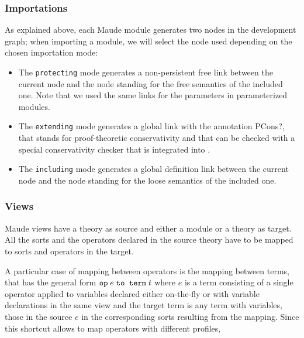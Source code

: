 \subsubsection{Importations}

As explained above, each Maude module generates two nodes in the development
graph;
when importing a module, we will select the node used depending on the
chosen importation mode:
\begin{itemize}

\item
The \verb"protecting" mode generates a non-persistent free link between
the current node and the node standing for the free semantics of the
included one. Note that we used the same links for the parameters in
parameterized modules.

\item
The \verb"extending" mode generates a global link with the annotation
\textsf{PCons?}, that stands for proof-theoretic conservativity and that
can be checked with a special conservativity checker that is
integrated into \Hets.

\item
The \verb"including" mode generates a global definition link between the
current node  and the node standing for the loose semantics of the
included one.
\end{itemize}

\subsubsection{Views}\label{subsec:dg_views}

Maude views have a theory as source and either a module or a theory
as target. All the sorts and the operators declared in the source theory
have to be mapped to sorts and operators in the target.

A particular case of mapping between operators is the mapping between
terms, that has the general form $\verb"op" \; e \; \verb"to term" \; t$
where $e$ is a term consisting of a 
single operator applied to variables declared either on-the-fly or with
variable declarations in the same view and the target term is any term
with variables, those in the source $e$ in the corresponding sorts
resulting from the mapping.
Since this shortcut allows to map operators with different profiles,

